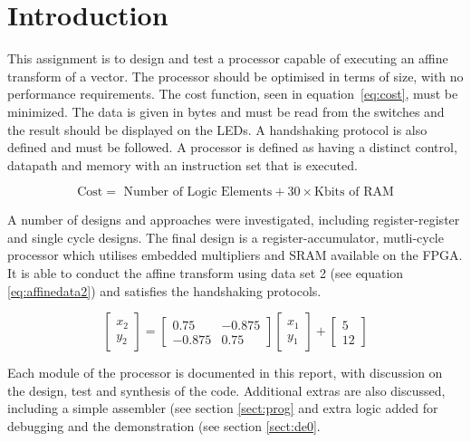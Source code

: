 
\section{Introduction}

This assignment is to design and test a processor capable of executing an affine transform of a vector. 
The processor should be optimised in terms of size, with no performance requirements. 
The cost function, seen in equation~\eqref{eq:cost}, must be minimized. 
The data is given in bytes and must be read from the switches and the result should be displayed on the LEDs. 
A handshaking protocol is also defined and must be followed. 
A processor is defined as having a distinct control, datapath and memory with an instruction set that is executed. 

\begin{equation}\label{eq:cost}
\mbox{Cost} = \mbox{ Number of Logic Elements} + 30 \times \mbox{Kbits of RAM}
\end{equation}

A number of designs and approaches were investigated, including register-register and single cycle designs.
The final design is a register-accumulator, mutli-cycle processor which utilises embedded multipliers and SRAM available on the FPGA. 
It is able to conduct the affine transform using data set 2 (see equation \ref{eq:affinedata2}) and satisfies the handshaking protocols. 

\begin{equation}\label{eq:affinedata2}
\begin{bmatrix}
x_2 \\
y_2 
\end{bmatrix}
=
\begin{bmatrix}
0.75 & -0.875 \\
-0.875 & 0.75 
\end{bmatrix}
\begin{bmatrix}
x_1 \\
y_1
\end{bmatrix}
+
\begin{bmatrix}
5 \\
12
\end{bmatrix}
\end{equation}


Each module of the processor is documented in this report, with discussion on the design, test and synthesis of the code. 
Additional extras are also discussed, including a simple assembler (see section \ref{sect:prog} and extra logic added for debugging and the demonstration (see section \ref{sect:de0}.
